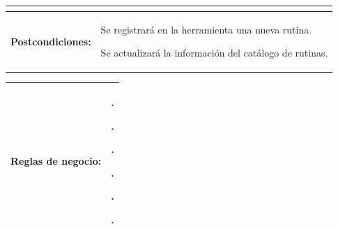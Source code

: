 \begin{table}[H]
\begin{tabular}{| c | p{12 cm} |}
\begin{compactitem}
							\end{compactitem}\\
\hline
\textbf{Postcondiciones:} & \vspace{-2mm}	%
							\begin{compactitem}
								\item Se registrará en la herramienta una nueva rutina.
								\item Se actualizará la información del catálogo de rutinas.
							\end{compactitem}\\
\hline
\end{tabular}
\end{table} 

\begin{table}[H]
\centering
\begin{tabular}{| c | p{12 cm} |}
\hline
\textbf{Reglas de negocio:} & \vspace{-2mm}	%
							\begin{compactitem}
								\item \nameref{rn:RND02}.
								\item \nameref{rn:RNR01}.
								\item \nameref{rn:RNR14}.
								\item \nameref{rn:RNR15}.
								\item \nameref{rn:RNR16}.
								\item \nameref{rn:RNR17}.
							\end{compactitem}\\							
\hline


\end{tabular}
\end{table}
